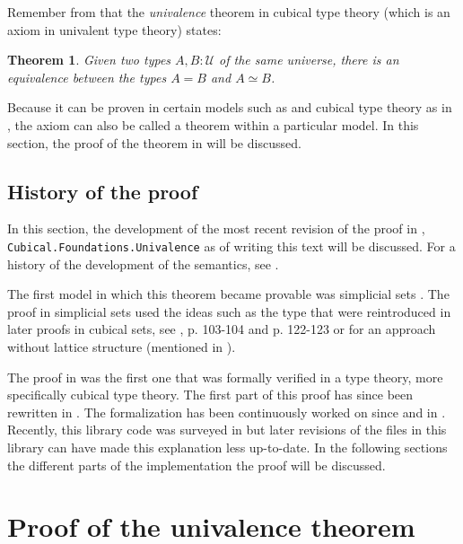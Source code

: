 \documentclass[12pt,a4paper,twoside,xetex]{book} %
\newcommand{\keyword}[1]{\emph{#1}\index{#1}}
\newtheorem{theorem}{Theorem}[section]
\begin{document}
Remember from  that the \keyword{univalence} theorem in cubical 
type theory (which is an axiom in univalent type theory) states:

\begin{theorem}
 Given two types $A, B : \mathcal{U}$ of the same universe, there is an 
equivalence between the types $A = B$ and $A \simeq B$.
 \end{theorem}

Because it can be proven in certain models such as \cite{Kapulkin2012} and 
cubical type theory as in , the axiom can also be called a theorem 
within a particular model. In this section, the proof of the theorem in 
\cite{Moertberg2018} will be discussed.

\subsection{History of the proof}

In this section, the development of the most recent revision of the proof in  \cite{Moertberg2018}, \texttt{Cubical.Foundations.Univalence} as of writing this 
text will be discussed. For a history of the development of the semantics, see .

The first model in which this theorem became provable was simplicial sets 
\cite{Kapulkin2012}. The proof in simplicial sets used the ideas such as the 
 type that were reintroduced in later proofs in cubical sets, see 
\cite{Huber2016}, p. 103-104 and p. 122-123 or \cite{Bezem2018} for an approach 
without lattice structure (mentioned in ). 

The proof in \cite{Huber2016} was the first one that was formally verified in a 
type theory, more specifically cubical type theory. The first part of this proof has since been rewritten 
in \cite{Weinberger2016}. The formalization has been continuously worked on 
since \cite{Moertberg2015} and \cite{Cohen2016} in \cite{Moertberg2018}. Recently, this library code was surveyed in \cite{Moertberg2018a} but later revisions of the files in this library can have made this explanation less up-to-date. In the following sections the different parts of the implementation the proof will be discussed.

\section{Proof of the univalence theorem}
\end{document}
